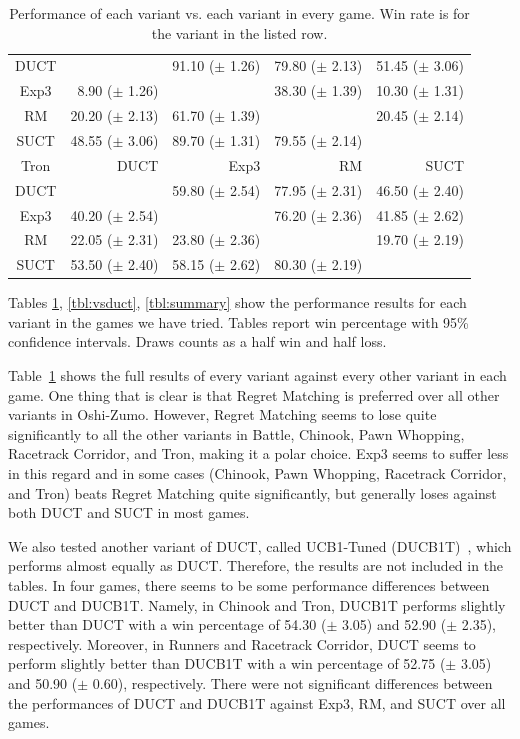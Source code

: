 \documentclass[conference]{IEEEtran}
\begin{document}
\begin{table}
\begin{center}
{\begin{tabular}{|c|rrrr|}
           DUCT    &              & 91.10 ($\pm$ 1.26)   & 79.80 ($\pm$ 2.13)   & 51.45 ($\pm$ 3.06)   \\
           Exp3    & 8.90 ($\pm$ 1.26)   &              & 38.30 ($\pm$ 1.39)   & 10.30 ($\pm$ 1.31)   \\
             RM    & 20.20 ($\pm$ 2.13)   & 61.70 ($\pm$ 1.39)   &              & 20.45 ($\pm$ 2.14)   \\
           SUCT    & 48.55 ($\pm$ 3.06)   & 89.70 ($\pm$ 1.31)   & 79.55 ($\pm$ 2.14)   &              \\
\hline
\hline
           Tron   &       DUCT   &       Exp3   &         RM   &       SUCT   \\
\hline
           DUCT    &              & 59.80 ($\pm$ 2.54)   & 77.95 ($\pm$ 2.31)   & 46.50 ($\pm$ 2.40)   \\
           Exp3    & 40.20 ($\pm$ 2.54)   &              & 76.20 ($\pm$ 2.36)   & 41.85 ($\pm$ 2.62)   \\
             RM    & 22.05 ($\pm$ 2.31)   & 23.80 ($\pm$ 2.36)   &              & 19.70 ($\pm$ 2.19)   \\
           SUCT    & 53.50 ($\pm$ 2.40)   & 58.15 ($\pm$ 2.62)   & 80.30 ($\pm$ 2.19)   &              \\
\hline
\end{tabular}
}
\end{center}
\caption{Performance of each variant vs. each variant in every game. Win rate is for the variant in the listed row. \label{tbl:cross}}
\end{table}


Tables \ref{tbl:cross}, \ref{tbl:vsduct}, \ref{tbl:summary} show the performance results for each variant in the games we have tried. 
Tables report win percentage with 95\% confidence intervals. Draws counts as a half win and half loss. 

Table~\ref{tbl:cross} shows the full results of every variant against every other variant in each game. One thing that is clear is that 
Regret Matching is preferred over all other variants in Oshi-Zumo. However, Regret Matching seems to lose quite significantly to all the 
other variants in Battle, Chinook, Pawn Whopping, Racetrack Corridor, and Tron, making it a polar choice. Exp3 seems to suffer less in this
regard and in some cases (Chinook, Pawn Whopping, Racetrack Corridor, and Tron) beats Regret Matching quite significantly, but generally loses
against both DUCT and SUCT in most games. 


We also tested another variant of DUCT, called UCB1-Tuned (DUCB1T)~\cite{Auer02Finite}, which performs almost equally as DUCT. Therefore, the results are not included in the tables. In four games, there seems to be some performance differences between DUCT and DUCB1T. Namely, in Chinook and Tron, DUCB1T performs slightly better than DUCT with a win percentage of 54.30 ($\pm$ 3.05) and 52.90 ($\pm$ 2.35), respectively. Moreover, in Runners and Racetrack Corridor, DUCT seems to perform slightly better than DUCB1T with a win percentage of 52.75 ($\pm$ 3.05) and 50.90 ($\pm$ 0.60), respectively.
There were not significant differences between the performances of DUCT and DUCB1T against Exp3, RM, and SUCT over all games.
\end{document}
